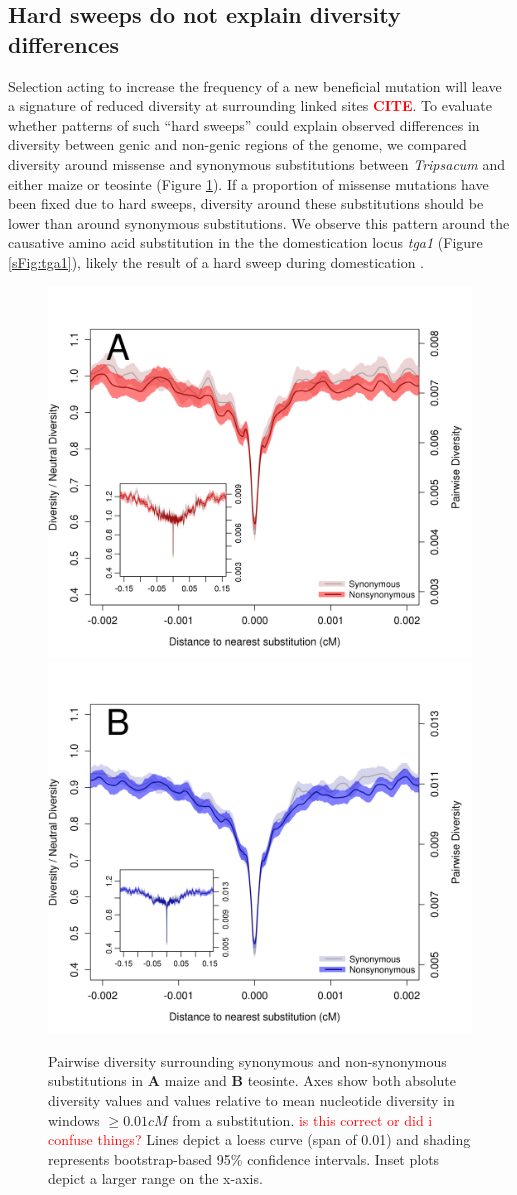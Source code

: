 \documentclass{pnastwo}
\newcommand{\jri}[1]{\textcolor{red}{\scriptsize #1}}
\newcommand{\citex}{\textcolor{red}{\bf CITE}}
\begin{document}
\begin{article}
\subsection{Hard sweeps do not explain diversity differences}
Selection acting to increase the frequency of a new beneficial mutation will leave a signature of reduced diversity at surrounding linked sites \citex.
To evaluate whether patterns of such ``hard sweeps'' could explain observed differences in diversity between genic and non-genic regions of the genome, we compared diversity around missense and synonymous substitutions between \emph{Tripsacum} and either maize or teosinte (Figure
\ref{fig:hardSweeps}).
If a proportion of missense mutations have been fixed due to hard sweeps, diversity around these substitutions should be lower than around synonymous substitutions. 
We observe this pattern around the causative amino acid substitution in the the domestication locus \emph{tga1} (Figure \ref{sFig:tga1}), likely the result of a hard sweep during domestication \cite{wang2005origin, wang2015}.

\begin{figure}[!htb]
\centering
\includegraphics[width=.45\textwidth]{FigsAndFiles/plotDiversity_TvM_Folded2_Significance_Aug}
\hspace{0.05\textwidth} \includegraphics[width=.45\textwidth]{FigsAndFiles/plotDiversity_TvT_Folded2_Significance_Aug}
\caption{Pairwise diversity surrounding synonymous and non-synonymous
  substitutions in {\bf A} maize and {\bf B} teosinte. Axes show both absolute diversity values and values relative to mean nucleotide diversity in windows $\geq 0.01 cM$ from a substitution. \jri{is this correct or did i confuse things?}
 Lines depict a loess curve (span of 0.01)  and shading represents bootstrap-based 95\% confidence intervals. Inset plots depict a larger range on the x-axis. \label{fig:hardSweeps}}
\end{figure}


\end{article}
\end{document}
